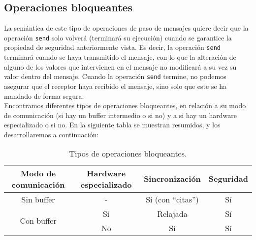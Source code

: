 \subsection{Operaciones bloqueantes}
La semántica de este tipo de operaciones de paso de mensajes quiere decir que la operación \verb|send| solo volverá (terminará su ejecución) cuando se garantice la propiedad de seguridad anteriormente vista. Es decir, la operación \verb|send| terminará cuando se haya transmitido el mensaje, con lo que la alteración de alguno de los valores que intervienen en el mensaje no modificará a su vez su valor dentro del mensaje. Cuando la operación \verb|send| termine, no podemos asegurar que el receptor haya recibido el mensaje, sino solo que este se ha mandado de forma segura.\\

Encontramos diferentes tipos de operaciones bloqueantes, en relación a su modo de comunicación (si hay un buffer intermedio o si no) y a si hay un hardware especializado o si no.
En la siguiente tabla se muestran resumidos, y los desarrollaremos a continuación:
\begin{table}[H]
\centering
\begin{tabular}{|c|c|c|c|}
    \hline
    Modo de comunicación & Hardware especializado & Sincronización & Seguridad \\
    \hline
    Sin buffer & - & Sí (con ``citas'') & Sí \\
    \hline
    \multirow{2}{*}{Con buffer} & Sí & Relajada & Sí \\
    \cline{2-4}
    & No & Sí & Sí \\
    \hline
\end{tabular}
\caption{Tipos de operaciones bloqueantes.}
\end{table}

